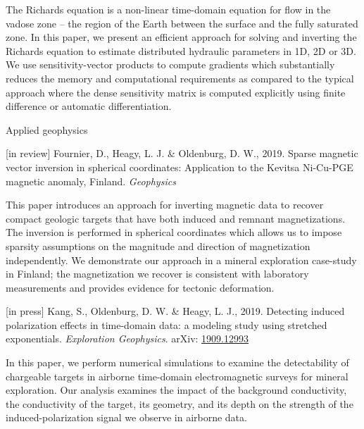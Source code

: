 \documentclass[a4paper, 11pt]{article}
\newcommand{\arxiv}[1]{arXiv: \href{https://arxiv.org/abs/#1}{#1}}
\newcommand{\subheading}[1]{
    \vspace{0.4cm}
    {\Large #1}\\
    \vspace{-0.2cm}
}
\begin{document}
The Richards equation is a non-linear time-domain equation for flow in the vadose zone -- the region of the Earth between the surface and the fully saturated zone. In this paper, we present an efficient approach for solving and inverting the Richards equation to estimate distributed hydraulic parameters in 1D, 2D or 3D. We use sensitivity-vector products to compute gradients which substantially reduces the memory and computational requirements as compared to the typical approach where the dense sensitivity matrix is computed explicitly using finite difference or automatic differentiation.


\subheading{Applied geophysics}

\begin{myitemize}
    \item{[in review] Fournier, D., Heagy, L. J. \& Oldenburg, D. W., 2019. Sparse magnetic vector inversion in spherical coordinates: Application to the Kevitsa Ni-Cu-PGE magnetic anomaly, Finland. \emph{Geophysics}}
\end{myitemize}

This paper introduces an approach for inverting magnetic data to recover compact geologic targets that have both induced and remnant magnetizations. The inversion is performed in spherical coordinates which allows us to impose sparsity assumptions on the magnitude and direction of magnetization independently. We demonstrate our approach in a mineral exploration case-study in Finland; the magnetization we recover is consistent with laboratory measurements and provides evidence for tectonic deformation. \\

\begin{myitemize}
    \item{[in press] Kang, S., Oldenburg, D. W. \& Heagy, L. J., 2019. Detecting induced polarization effects in time-domain data: a modeling study using stretched exponentials. \emph{Exploration Geophysics}. \arxiv{1909.12993}}
\end{myitemize}

In this paper, we perform numerical simulations to examine the detectability of chargeable targets in airborne time-domain electromagnetic surveys for mineral exploration. Our analysis examines the impact of the background conductivity, the conductivity of the target, its geometry, and its depth on the strength of the induced-polarization signal we observe in airborne data.
\end{document}
